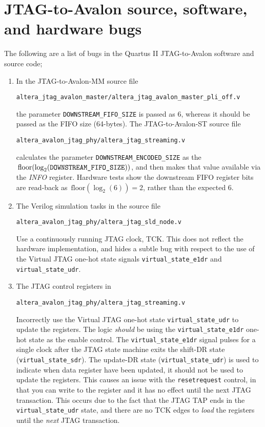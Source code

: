 \documentclass[10pt,twoside]{article}
\newcommand{\floor}{\ensuremath{\,\text{floor}}}
\begin{document}
\clearpage
\section{JTAG-to-Avalon source, software, and hardware bugs}
\label{app:bugs}

The following are a list of bugs in the Quartus II JTAG-to-Avalon
software and source code;
%
\begin{enumerate}
\item In the JTAG-to-Avalon-MM source file

\verb+altera_jtag_avalon_master/altera_jtag_avalon_master_pli_off.v+

the parameter \verb+DOWNSTREAM_FIFO_SIZE+ is passed as 6, whereas it
should be passed as the FIFO size (64-bytes). The
JTAG-to-Avalon-ST source file

\verb+altera_avalon_jtag_phy/altera_jtag_streaming.v+

calculates the parameter \verb+DOWNSTREAM_ENCODED_SIZE+
as the $\floor(\log_2(\text{\tt DOWNSTREAM\_FIFO\_SIZE}))$, and
then makes that value available via the {\em INFO} register.
Hardware tests show the downstream FIFO register bits are
read-back as $\floor(\log_2(6)) = 2$, rather than the
expected 6.
%
\item The Verilog simulation tasks in the source file

\verb+altera_avalon_jtag_phy/altera_jtag_sld_node.v+

Use a continuously running JTAG clock, TCK. This does not
reflect the hardware implementation, and hides a subtle bug with
respect to the use of the Virtual JTAG one-hot state signals
\verb+virtual_state_e1dr+ and \verb+virtual_state_udr+.

\item The JTAG control registers in

\verb+altera_avalon_jtag_phy/altera_jtag_streaming.v+

Incorrectly use the Virtual JTAG one-hot state \verb+virtual_state_udr+
to update the registers. The logic {\em should} be using the
\verb+virtual_state_e1dr+ one-hot state as the enable control.
The \verb+virtual_state_e1dr+ signal pulses for a single clock
after the JTAG state machine exits the shift-DR state (\verb+virtual_state_sdr+).
The update-DR state (\verb+virtual_state_udr+) is used to indicate
when data register have been updated, it should not be used to
update the registers. This causes an issue with the \verb+resetrequest+
control, in that you can write to the register and it has no effect
until the next JTAG transaction. This occurs due to the fact that
the JTAG TAP ends in the \verb+virtual_state_udr+ state, and there
are no TCK edges to {\em load} the registers until the {\em next}
JTAG transaction.


\end{enumerate}
\end{document}
